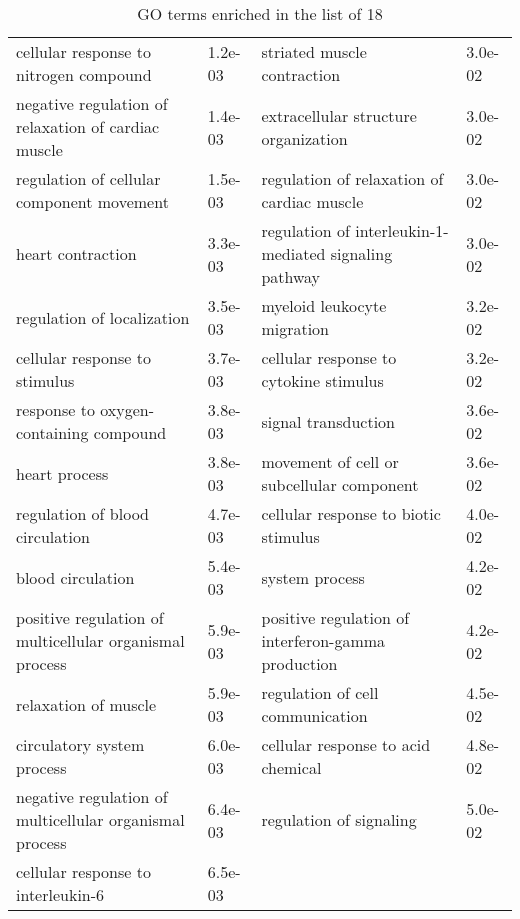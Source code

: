 \documentclass[fleqn,10pt]{SelfArx} %
\begin{document}
\begin{table}[!htb]
\begin{tabularx}{\textwidth}{XlXl}
		cellular response to nitrogen compound & 1.2e-03 & striated muscle contraction & 3.0e-02 \\ 
		negative regulation of relaxation of cardiac muscle & 1.4e-03 & extracellular structure organization & 3.0e-02 \\ 
		regulation of cellular component movement & 1.5e-03 & regulation of relaxation of cardiac muscle & 3.0e-02 \\ 
		heart contraction & 3.3e-03 & regulation of interleukin-1-mediated signaling pathway & 3.0e-02 \\ 
		regulation of localization & 3.5e-03 & myeloid leukocyte migration & 3.2e-02 \\ 
		cellular response to stimulus & 3.7e-03 & cellular response to cytokine stimulus & 3.2e-02 \\ 
		response to oxygen-containing compound & 3.8e-03 & signal transduction & 3.6e-02 \\ 
		heart process & 3.8e-03 & movement of cell or subcellular component & 3.6e-02 \\ 
		regulation of blood circulation & 4.7e-03 & cellular response to biotic stimulus & 4.0e-02 \\ 
		blood circulation & 5.4e-03 & system process & 4.2e-02 \\ 
		positive regulation of multicellular organismal process & 5.9e-03 & positive regulation of interferon-gamma production & 4.2e-02 \\ 
		relaxation of muscle & 5.9e-03 & regulation of cell communication & 4.5e-02 \\ 
		circulatory system process & 6.0e-03 & cellular response to acid chemical & 4.8e-02 \\ 
		negative regulation of multicellular organismal process & 6.4e-03 & regulation of signaling & 5.0e-02 \\ 
		cellular response to interleukin-6 & 6.5e-03 &  &  \\ 
	\end{tabularx}
	\smallskip
	\caption{GO terms enriched in the list of 18}
	\label{tab:GO18}
\end{table}
\end{document}
